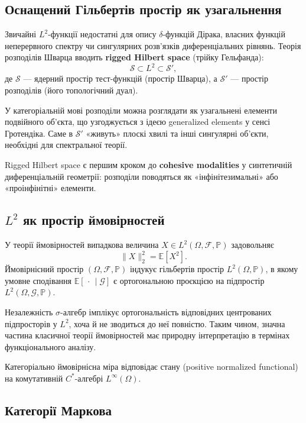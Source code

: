 \documentclass[a4paper,12pt]{article}
\begin{document}
\subsection{Оснащений Гільбертів простір як узагальнення}

Звичайні $L^2$-функції недостатні для опису $\delta$-функцій Дірака, власних функцій неперервного спектру чи сингулярних розв’язків диференціальних рівнянь. Теорія розподілів Шварца вводить \textbf{rigged Hilbert space} (трійку Гельфанда):
\[
\mathcal{S} \subset L^2 \subset \mathcal{S}',
\]
де $\mathcal{S}$ — ядерний простір тест-функцій (простір Шварца), а $\mathcal{S}'$ — простір розподілів (його топологічний дуал).

У категоріальній мові розподіли можна розглядати як узагальнені елементи подвійного об’єкта, що узгоджується з ідеєю generalized elements у сенсі Гротендіка. Саме в $\mathcal{S}'$ «живуть» плоскі хвилі та інші сингулярні об’єкти, необхідні для спектральної теорії. 

Rigged Hilbert space є першим кроком до \textbf{cohesive modalities} у синтетичній диференціальній геометрії: розподіли поводяться як «інфінітезимальні» або «проінфінітні» елементи.

\subsection{$L^2$ як простір ймовірностей}

У теорії ймовірностей випадкова величина $X \in L^2(\Omega, \mathcal{F}, \mathbb{P})$ задовольняє
\[
\|X\|_2^2 = \mathbb{E}[X^2].
\]
Ймовірнісний простір $(\Omega, \mathcal{F}, \mathbb{P})$ індукує гільбертів простір $L^2(\Omega, \mathbb{P})$, в якому умовне сподівання $\mathbb{E}[\,\cdot\,\mid\mathcal{G}]$ є ортогональною проєкцією на підпростір $L^2(\Omega, \mathcal{G}, \mathbb{P})$.

Незалежність $\sigma$-алгебр імплікує ортогональність відповідних центрованих підпросторів у $L^2$, хоча й не зводиться до неї повністю. Таким чином, значна частина класичної теорії ймовірностей має природну інтерпретацію в термінах функціонального аналізу.

Категоріально ймовірнісна міра відповідає стану (positive normalized functional) на комутативній $C^*$-алгебрі $L^\infty(\Omega)$.

\newpage
\subsection{Категорії Маркова}
\end{document}
